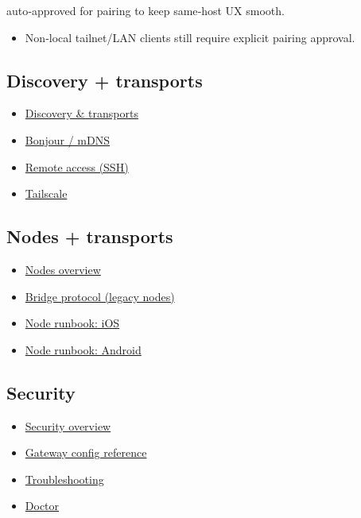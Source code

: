 auto‑approved for pairing to keep same‑host UX smooth.
\begin{itemize}
  \item Non‑local tailnet/LAN clients still require explicit pairing approval.
\end{itemize}


\subsection{Discovery + transports}


\begin{itemize}
  \item \href{/gateway/discovery}{Discovery \& transports}
  \item \href{/gateway/bonjour}{Bonjour / mDNS}
  \item \href{/gateway/remote}{Remote access (SSH)}
  \item \href{/gateway/tailscale}{Tailscale}
\end{itemize}


\subsection{Nodes + transports}


\begin{itemize}
  \item \href{/nodes}{Nodes overview}
  \item \href{/gateway/bridge-protocol}{Bridge protocol (legacy nodes)}
  \item \href{/platforms/ios}{Node runbook: iOS}
  \item \href{/platforms/android}{Node runbook: Android}
\end{itemize}


\subsection{Security}


\begin{itemize}
  \item \href{/gateway/security}{Security overview}
  \item \href{/gateway/configuration}{Gateway config reference}
  \item \href{/gateway/troubleshooting}{Troubleshooting}
  \item \href{/gateway/doctor}{Doctor}
\end{itemize}



